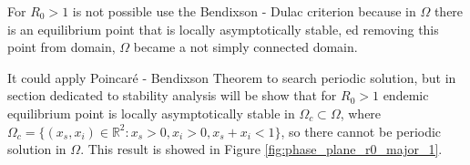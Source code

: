 For $R_0 > 1$ is not possible use the Bendixson - Dulac criterion because in $\Omega$ there is an equilibrium point that is locally asymptotically stable, ed removing this point from domain, $\Omega$ became a not simply connected domain.

It could apply Poincaré - Bendixson Theorem to search periodic solution, but in section dedicated to stability analysis will be show that for $R_0 > 1$ endemic equilibrium point is locally asymptotically stable in $\Omega_c \subset \Omega$, where $\Omega_c = \{\left(x_s,x_i\right) \in \mathbb{R}^2 : x_s > 0, x_i > 0, x_s + x_i < 1\}$, so there cannot be periodic solution in $\Omega$. This result is showed in Figure \ref{fig:phase_plane_r0_major_1}.